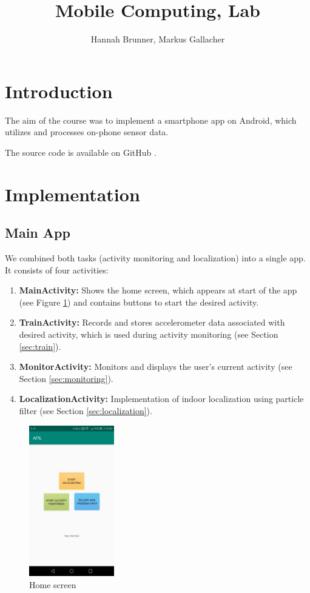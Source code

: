 \documentclass[12pt]{article}
\begin{document}
 
\title{Mobile Computing, Lab}
\author{Hannah Brunner, Markus Gallacher}

\maketitle


\section{Introduction}

The aim of the course was to implement a smartphone app on Android, which utilizes and processes on-phone sensor data. 

The source code is available on GitHub \cite{repo}.

\section{Implementation}
\subsection{Main App}
We combined both tasks (activity monitoring and localization) into a single app. It consists of four activities:
\begin{enumerate}
	\item \textbf{MainActivity:} Shows the home screen, which appears at start of the app (see Figure \ref{fig:main}) and contains buttons to start the desired activity.
	\item \textbf{TrainActivity:} Records and stores accelerometer data associated with desired activity, which is used during activity monitoring (see Section \ref{sec:train}).
	\item \textbf{MonitorActivity:} Monitors and displays the user's current activity (see Section \ref{sec:monitoring}).
	\item \textbf{LocalizationActivity:} Implementation of indoor localization using particle filter (see Section \ref{sec:localization}).
\end{enumerate}

\begin{figure}
	\centering
	\includegraphics[width=140px]{images/main.jpeg}
	\caption{Home screen}
	\label{fig:main}
\end{figure}
\end{document}
